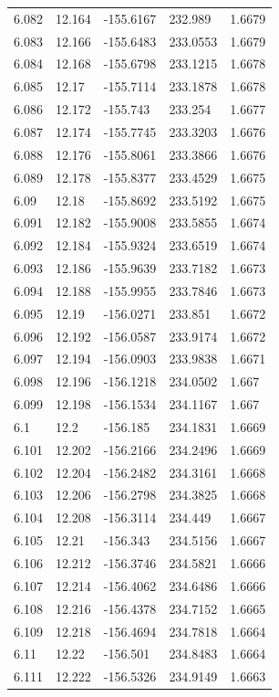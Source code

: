 \begin{tabular}{lllll}
6.082 & 12.164 & -155.6167 & 232.989 & 1.6679 \\
6.083 & 12.166 & -155.6483 & 233.0553 & 1.6679 \\
6.084 & 12.168 & -155.6798 & 233.1215 & 1.6678 \\
6.085 & 12.17 & -155.7114 & 233.1878 & 1.6678 \\
6.086 & 12.172 & -155.743 & 233.254 & 1.6677 \\
6.087 & 12.174 & -155.7745 & 233.3203 & 1.6676 \\
6.088 & 12.176 & -155.8061 & 233.3866 & 1.6676 \\
6.089 & 12.178 & -155.8377 & 233.4529 & 1.6675 \\
6.09 & 12.18 & -155.8692 & 233.5192 & 1.6675 \\
6.091 & 12.182 & -155.9008 & 233.5855 & 1.6674 \\
6.092 & 12.184 & -155.9324 & 233.6519 & 1.6674 \\
6.093 & 12.186 & -155.9639 & 233.7182 & 1.6673 \\
6.094 & 12.188 & -155.9955 & 233.7846 & 1.6673 \\
6.095 & 12.19 & -156.0271 & 233.851 & 1.6672 \\
6.096 & 12.192 & -156.0587 & 233.9174 & 1.6672 \\
6.097 & 12.194 & -156.0903 & 233.9838 & 1.6671 \\
6.098 & 12.196 & -156.1218 & 234.0502 & 1.667 \\
6.099 & 12.198 & -156.1534 & 234.1167 & 1.667 \\
6.1 & 12.2 & -156.185 & 234.1831 & 1.6669 \\
6.101 & 12.202 & -156.2166 & 234.2496 & 1.6669 \\
6.102 & 12.204 & -156.2482 & 234.3161 & 1.6668 \\
6.103 & 12.206 & -156.2798 & 234.3825 & 1.6668 \\
6.104 & 12.208 & -156.3114 & 234.449 & 1.6667 \\
6.105 & 12.21 & -156.343 & 234.5156 & 1.6667 \\
6.106 & 12.212 & -156.3746 & 234.5821 & 1.6666 \\
6.107 & 12.214 & -156.4062 & 234.6486 & 1.6666 \\
6.108 & 12.216 & -156.4378 & 234.7152 & 1.6665 \\
6.109 & 12.218 & -156.4694 & 234.7818 & 1.6664 \\
6.11 & 12.22 & -156.501 & 234.8483 & 1.6664 \\
6.111 & 12.222 & -156.5326 & 234.9149 & 1.6663 \\

\end{tabular}
